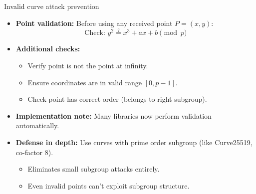 \documentclass[aspectratio=169, lualatex, handout]{beamer}
\begin{document}
\begin{frame}{Invalid curve attack prevention}
	\begin{itemize}[<+->]
		\item \textbf{Point validation:} Before using any received point $P = (x, y)$:
		      $$\text{Check: } y^2 \stackrel{?}{=} x^3 + ax + b \pmod{p}$$
		\item \textbf{Additional checks:}
		      \begin{itemize}
			      \item Verify point is not the point at infinity.
			      \item Ensure coordinates are in valid range $[0, p-1]$.
			      \item Check point has correct order (belongs to right subgroup).
		      \end{itemize}
		\item \textbf{Implementation note:} Many libraries now perform validation automatically.
		\item \textbf{Defense in depth:} Use curves with prime order subgroup (like Curve25519, co-factor 8).
		      \begin{itemize}
			      \item Eliminates small subgroup attacks entirely.
			      \item Even invalid points can't exploit subgroup structure.
		      \end{itemize}
	\end{itemize}
\end{frame}
\end{document}
